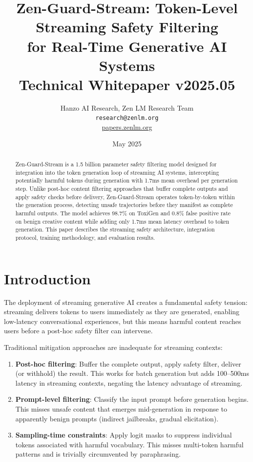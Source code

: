 \documentclass[11pt,a4paper]{article}
\title{\textbf{Zen-Guard-Stream: Token-Level Streaming Safety Filtering\\
for Real-Time Generative AI Systems}\\[0.5em]
\large Technical Whitepaper v2025.05}
\author{Hanzo AI Research, Zen LM Research Team\\
\texttt{research@zenlm.org}\\
\href{https://papers.zenlm.org}{papers.zenlm.org}}
\date{May 2025}
\begin{document}
\maketitle

\begin{abstract}
Zen-Guard-Stream is a 1.5 billion parameter safety filtering model designed for integration into the token generation loop of streaming AI systems, intercepting potentially harmful tokens during generation with 1.7ms mean overhead per generation step. Unlike post-hoc content filtering approaches that buffer complete outputs and apply safety checks before delivery, Zen-Guard-Stream operates token-by-token within the generation process, detecting unsafe trajectories before they manifest as complete harmful outputs. The model achieves 98.7\% on ToxiGen and 0.8\% false positive rate on benign creative content while adding only 1.7ms mean latency overhead to token generation. This paper describes the streaming safety architecture, integration protocol, training methodology, and evaluation results.
\end{abstract}

\tableofcontents
\newpage

\section{Introduction}

The deployment of streaming generative AI creates a fundamental safety tension: streaming delivers tokens to users immediately as they are generated, enabling low-latency conversational experiences, but this means harmful content reaches users before a post-hoc safety filter can intervene.

Traditional mitigation approaches are inadequate for streaming contexts:

\begin{enumerate}
  \item \textbf{Post-hoc filtering}: Buffer the complete output, apply safety filter, deliver (or withhold) the result. This works for batch generation but adds 100--500ms latency in streaming contexts, negating the latency advantage of streaming.
  \item \textbf{Prompt-level filtering}: Classify the input prompt before generation begins. This misses unsafe content that emerges mid-generation in response to apparently benign prompts (indirect jailbreaks, gradual elicitation).
  \item \textbf{Sampling-time constraints}: Apply logit masks to suppress individual tokens associated with harmful vocabulary. This misses multi-token harmful patterns and is trivially circumvented by paraphrasing.
\end{enumerate}
\end{document}
